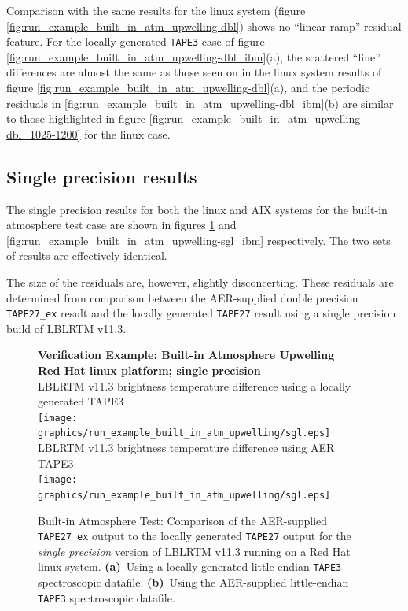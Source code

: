 Comparison with the same results for the linux system (figure \ref{fig:run_example_built_in_atm_upwelling-dbl}) shows no ``linear ramp'' residual feature. For the locally generated \texttt{TAPE3} case of figure \ref{fig:run_example_built_in_atm_upwelling-dbl_ibm}(a), the scattered ``line'' differences are almost the same as those seen on in the linux system results of figure \ref{fig:run_example_built_in_atm_upwelling-dbl}(a), and the periodic residuals in \ref{fig:run_example_built_in_atm_upwelling-dbl_ibm}(b) are similar to those highlighted in figure \ref{fig:run_example_built_in_atm_upwelling-dbl_1025-1200} for the linux case.


\subsection{Single precision results}
The single precision results for both the linux and AIX systems for the built-in atmosphere test case are shown in figures \ref{fig:run_example_built_in_atm_upwelling-sgl} and \ref{fig:run_example_built_in_atm_upwelling-sgl_ibm} respectively. The two sets of results are effectively identical.

The size of the residuals are, however, slightly disconcerting. These residuals are determined from comparison between the AER-supplied double precision \texttt{TAPE27\_ex} result and the locally generated \texttt{TAPE27} result using a single precision build of LBLRTM v11.3.

\begin{figure}[htp]
  \centering
  \qquad\sffamily\textbf{Verification Example: Built-in Atmosphere Upwelling}\\
  \qquad\sffamily\textbf{Red Hat linux platform; single precision}\\
  \qquad\textsf{LBLRTM v11.3 brightness temperature difference using a locally generated TAPE3}\\
  \texttt{[image: graphics/run\_example\_built\_in\_atm\_upwelling/sgl.eps]}
  \qquad\textsf{LBLRTM v11.3 brightness temperature difference using AER TAPE3}\\
  \texttt{[image: graphics/run\_example\_built\_in\_atm\_upwelling/sgl.eps]}
  \caption{Built-in Atmosphere Test: Comparison of the AER-supplied \texttt{TAPE27\_ex} output to the locally generated \texttt{TAPE27} output for the \textsl{single precision} version of LBLRTM v11.3 running on a Red Hat linux system. \mbox{\textbf{(a)} Using} a locally generated little-endian \texttt{TAPE3} spectroscopic datafile. \mbox{\textbf{(b)} Using} the AER-supplied little-endian \texttt{TAPE3} spectroscopic datafile.}
  \label{fig:run_example_built_in_atm_upwelling-sgl}
\end{figure}

